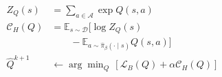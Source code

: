 \documentclass[border=7pt]{standalone}
\begin{document}
\color{ink}
$\displaystyle \begin{aligned} Z_Q(s)&=\sum_{a\in\mathcal A}\exp Q(s,a)\\ \mathcal C_H(Q)&=\mathbb E_{s\sim\mathcal D}\!\big[\log Z_Q(s)\\ &\qquad-\mathbb E_{a\sim\widehat\pi_\beta(\cdot\mid s)}Q(s,a)\big]\\ \widehat Q^{k+1}&\leftarrow\arg\min_Q\,[\mathcal L_B(Q)+\alpha\mathcal C_H(Q)]\end{aligned}$
\end{document}
